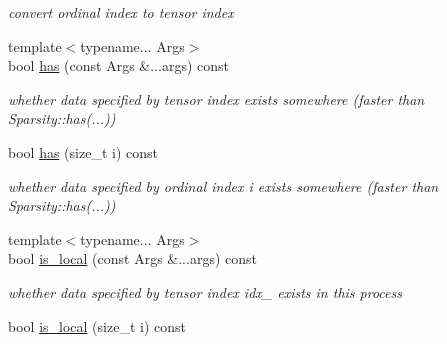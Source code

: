 \begin{DoxyCompactItemize}
\begin{DoxyCompactList}\small\item\em convert ordinal index to tensor index \item\end{DoxyCompactList}\item 
\hypertarget{classbtas_1_1_sp_tensor_a3d70b41b35d9d47f0c12c961ec711636}{
{\footnotesize template$<$typename... Args$>$ }\\bool \hyperlink{classbtas_1_1_sp_tensor_a3d70b41b35d9d47f0c12c961ec711636}{has} (const Args \&...args) const }
\label{classbtas_1_1_sp_tensor_a3d70b41b35d9d47f0c12c961ec711636}

\begin{DoxyCompactList}\small\item\em whether data specified by tensor index exists somewhere (faster than Sparsity::has(...)) \item\end{DoxyCompactList}\item 
\hypertarget{classbtas_1_1_sp_tensor_acbd4014e07da6070e372cbf02fb6a00b}{
bool \hyperlink{classbtas_1_1_sp_tensor_acbd4014e07da6070e372cbf02fb6a00b}{has} (size\_\-t i) const }
\label{classbtas_1_1_sp_tensor_acbd4014e07da6070e372cbf02fb6a00b}

\begin{DoxyCompactList}\small\item\em whether data specified by ordinal index i exists somewhere (faster than Sparsity::has(...)) \item\end{DoxyCompactList}\item 
\hypertarget{classbtas_1_1_sp_tensor_af7160fcc8617e83714e1228cc8f3e03b}{
{\footnotesize template$<$typename... Args$>$ }\\bool \hyperlink{classbtas_1_1_sp_tensor_af7160fcc8617e83714e1228cc8f3e03b}{is\_\-local} (const Args \&...args) const }
\label{classbtas_1_1_sp_tensor_af7160fcc8617e83714e1228cc8f3e03b}

\begin{DoxyCompactList}\small\item\em whether data specified by tensor index idx\_\- exists in this process \item\end{DoxyCompactList}\item 
\hypertarget{classbtas_1_1_sp_tensor_afceb7b6dde0106050c4e1e6b8b6417a2}{
bool \hyperlink{classbtas_1_1_sp_tensor_afceb7b6dde0106050c4e1e6b8b6417a2}{is\_\-local} (size\_\-t i) const }
\label{classbtas_1_1_sp_tensor_afceb7b6dde0106050c4e1e6b8b6417a2}


\end{DoxyCompactItemize}
